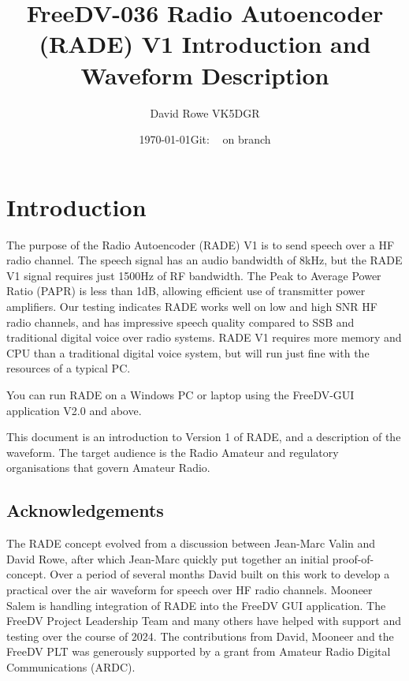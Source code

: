 \documentclass{article}
\newcommand{\commit}{\dots~(in \emph{packed-refs})}}
\newcommand{\gitrevision}{%
  \StrLeft{\commit}{7}%
}
\begin{document}


\title{FreeDV-036 Radio Autoencoder (RADE) V1 Introduction and Waveform Description}
\author{David Rowe VK5DGR}
\date{\today \quad Git: \texttt{\gitrevision} on branch \texttt{\branch}\\}
\maketitle

\section{Introduction}

The purpose of the Radio Autoencoder (RADE) V1 is to send speech over a HF radio channel. The speech signal has an audio bandwidth of 8kHz, but the RADE V1 signal requires just 1500Hz of RF bandwidth. The Peak to Average Power Ratio (PAPR) is less than 1dB, allowing efficient use of transmitter power amplifiers. Our testing indicates RADE works well on low and high SNR HF radio channels, and has impressive speech quality compared to SSB and traditional digital voice over radio systems. RADE V1 requires more memory and CPU than a traditional digital voice system, but will run just fine with the resources of a typical PC.

You can run RADE on a Windows PC or laptop using the FreeDV-GUI application V2.0 and above.

This document is an introduction to Version 1 of RADE, and a description of the waveform. The target audience is the Radio Amateur and regulatory organisations that govern Amateur Radio.

\subsection{Acknowledgements}

The RADE concept evolved from a discussion between Jean-Marc Valin and David Rowe, after which Jean-Marc quickly put together an initial proof-of-concept. Over a period of several months David built on this work to develop a practical over the air waveform for speech over HF radio channels.  Mooneer Salem is handling integration of RADE into the FreeDV GUI application. The FreeDV Project Leadership Team and many others have helped with support and testing over the course of 2024. The contributions from David, Mooneer and the FreeDV PLT was generously supported by a grant from Amateur Radio Digital Communications (ARDC).
\end{document}
